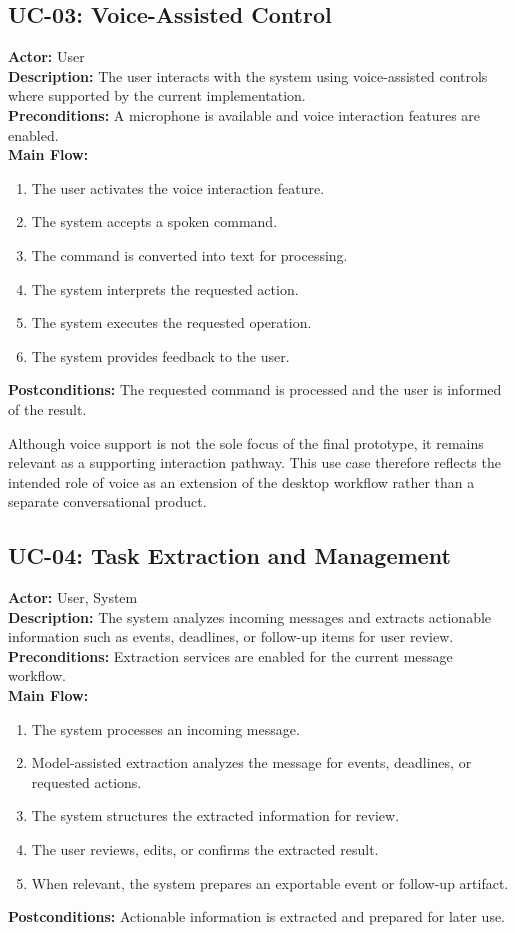 \subsection{UC-03: Voice-Assisted Control}
\textbf{Actor:} User \\
\textbf{Description:} The user interacts with the system using voice-assisted controls where supported by the current implementation. \\
\textbf{Preconditions:} A microphone is available and voice interaction features are enabled. \\
\textbf{Main Flow:}
\begin{enumerate}
    \item The user activates the voice interaction feature.
    \item The system accepts a spoken command.
    \item The command is converted into text for processing.
    \item The system interprets the requested action.
    \item The system executes the requested operation.
    \item The system provides feedback to the user.
\end{enumerate}
\textbf{Postconditions:} The requested command is processed and the user is informed of the result.

Although voice support is not the sole focus of the final prototype, it remains relevant as a supporting interaction pathway. This use case therefore reflects the intended role of voice as an extension of the desktop workflow rather than a separate conversational product.

\subsection{UC-04: Task Extraction and Management}
\textbf{Actor:} User, System \\
\textbf{Description:} The system analyzes incoming messages and extracts actionable information such as events, deadlines, or follow-up items for user review. \\
\textbf{Preconditions:} Extraction services are enabled for the current message workflow. \\
\textbf{Main Flow:}
\begin{enumerate}
    \item The system processes an incoming message.
    \item Model-assisted extraction analyzes the message for events, deadlines, or requested actions.
    \item The system structures the extracted information for review.
    \item The user reviews, edits, or confirms the extracted result.
    \item When relevant, the system prepares an exportable event or follow-up artifact.
\end{enumerate}
\textbf{Postconditions:} Actionable information is extracted and prepared for later use.

